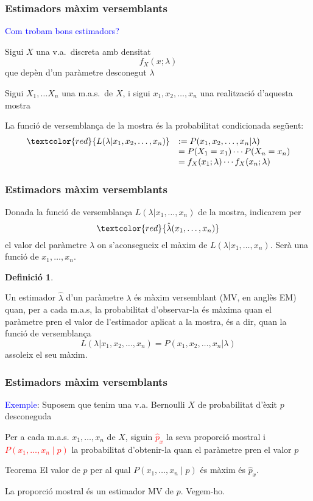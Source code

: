 \documentclass[12pt,t]{beamer}
\newcommand{\red}[1]{\textcolor{red}{#1}}
\newcommand{\blue}[1]{\textcolor{blue}{#1}}
\renewcommand{\emph}[1]{{\color{red}#1}}
\theoremstyle{plain}
\theoremstyle{definition}
\newtheorem{defin}{Definició}
\begin{document}
\begin{frame}
\frametitle{Estimadors màxim versemblants}

\blue{Com trobam bons estimadors?}
\medskip

Sigui $X$ una v.a.\ \emph{discreta} amb densitat 
$$
f_X(x;\lambda)
$$
que depèn d'un
paràmetre desconegut $\lambda$
\medskip

Sigui $X_{1},\ldots X_{n}$ una m.a.s.\ de $X$, i sigui $x_1,x_2,\ldots,x_n$ una realització d'aquesta mostra
\medskip


La \emph{funció de versemblança} de la mostra és la probabilitat condicionada següent:
$$
\begin{array}{rl}
\red{L(\lambda|x_1,x_2,\ldots,x_n)} & := P(x_1,x_2,\ldots,x_n|\lambda)\\&=P(X_1=x_1)\cdots P(X_n=x_n)\\
& = f_X(x_1;\lambda)\cdots f_X(x_n;\lambda)
\end{array}
$$

\end{frame}

\begin{frame}
\frametitle{Estimadors màxim versemblants}

Donada la funció de versemblança $L(\lambda|x_1,\ldots,x_n)$ de la mostra, indicarem per 
$$
\red{\hat{\lambda}(x_1,\ldots,x_n)}
$$ 
el valor del paràmetre $\lambda$ on s'aconsegueix el màxim
de $L(\lambda|x_1,\ldots,x_n)$. Serà una funció de $x_1,\ldots,x_n$.
\medskip


\begin{defin}
\begin{small}
Un estimador $\hat{\lambda}$ d'un paràmetre $\lambda$ és \emph{màxim versemblant} (\emph{MV}, en anglès \emph{EM}) quan, per a cada m.a.s, la probabilitat d'observar-la és màxima quan el paràmetre pren el valor de l'estimador aplicat a la mostra, és a dir, quan la funció de versemblança
$$L(\lambda|x_1,x_2,\ldots,x_n)= P(x_1,x_2,\ldots,x_n|\lambda)$$
 assoleix el seu màxim.
 \end{small}
\end{defin}
\end{frame}

\begin{frame}
\frametitle{Estimadors màxim versemblants}

\blue{Exemple}: Suposem que tenim una v.a. Bernoulli $X$ de probabilitat d'èxit $p$ desconeguda\medskip

Per a cada m.a.s. $x_1,\ldots,x_n$ de $X$, siguin \red{$\widehat{p}_x$} la seva proporció mostral i  \red{$P(x_1,\ldots,x_n\mid p)$} la probabilitat d'obtenir-la quan el paràmetre pren el valor $p$

\begin{block}{Teorema}
El valor de $p$ per al qual $P(x_1,\ldots,x_n\mid p)$ és màxim és $\widehat{p}_x$.
\end{block}

La proporció mostral és un estimador MV de $p$. Vegem-ho. 

\end{frame}
\end{document}
